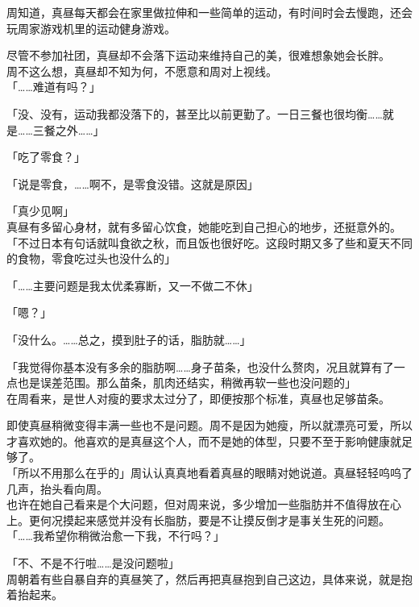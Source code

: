 周知道，真昼每天都会在家里做拉伸和一些简单的运动，有时间时会去慢跑，还会玩周家游戏机里的运动健身游戏。

尽管不参加社团，真昼却不会落下运动来维持自己的美，很难想象她会长胖。\\

周不这么想，真昼却不知为何，不愿意和周对上视线。\\

「……难道有吗？」

「没、没有，运动我都没落下的，甚至比以前更勤了。一日三餐也很均衡……就是……三餐之外……」

「吃了零食？」

「说是零食，……啊不，是零食没错。这就是原因」

「真少见啊」\\

真昼有多留心身材，就有多留心饮食，她能吃到自己担心的地步，还挺意外的。\\

「不过日本有句话就叫食欲之秋，而且饭也很好吃。这段时期又多了些和夏天不同的食物，零食吃过头也没什么的」

「……主要问题是我太优柔寡断，又一不做二不休」

「嗯？」

「没什么。……总之，摸到肚子的话，脂肪就……」

「我觉得你基本没有多余的脂肪啊……身子苗条，也没什么赘肉，况且就算有了一点也是误差范围。那么苗条，肌肉还结实，稍微再软一些也没问题的」\\

在周看来，是世人对瘦的要求太过分了，即便按那个标准，真昼也足够苗条。

即使真昼稍微变得丰满一些也不是问题。周不是因为她瘦，所以就漂亮可爱，所以才喜欢她的。他喜欢的是真昼这个人，而不是她的体型，只要不至于影响健康就足够了。\\

「所以不用那么在乎的」周认认真真地看着真昼的眼睛对她说道。真昼轻轻呜呜了几声，抬头看向周。\\

也许在她自己看来是个大问题，但对周来说，多少增加一些脂肪并不值得放在心上。更何况摸起来感觉并没有长脂肪，要是不让摸反倒才是事关生死的问题。\\

「……我希望你稍微治愈一下我，不行吗？」

「不、不是不行啦……是没问题啦」\\

周朝着有些自暴自弃的真昼笑了，然后再把真昼抱到自己这边，具体来说，就是抱着抬起来。

